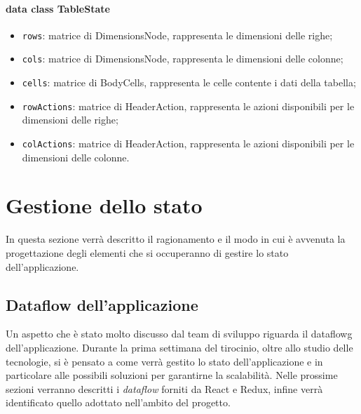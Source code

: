 \paragraph*{data class TableState}
\begin{itemize}
	\item \verb|rows|: matrice di DimensionsNode, rappresenta le dimensioni delle righe;
	\item \verb|cols|: matrice di DimensionsNode, rappresenta le dimensioni delle colonne;
	\item \verb|cells|: matrice di BodyCells, rappresenta le celle contente i dati della tabella;
	\item \verb|rowActions|: matrice di HeaderAction, rappresenta le azioni disponibili per le dimensioni delle righe;
	\item \verb|colActions|: matrice di HeaderAction, rappresenta le azioni disponibili per le dimensioni delle colonne.
\end{itemize}

\section{Gestione dello stato}
In questa sezione verrà descritto il ragionamento e il modo in cui è avvenuta la progettazione degli elementi che si occuperanno di gestire lo stato dell'applicazione.

\subsection{Dataflow dell'applicazione}
Un aspetto che è stato molto discusso dal team di sviluppo riguarda il \gls{dataflowg} dell'applicazione. Durante la prima settimana del tirocinio, oltre allo studio delle tecnologie, si è pensato a come verrà gestito lo stato dell'applicazione e in particolare alle possibili soluzioni per garantirne la scalabilità. Nelle prossime sezioni verranno descritti i \emph{dataflow} forniti da React e Redux, infine verrà identificato quello adottato nell'ambito del progetto.

